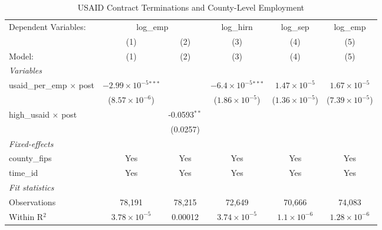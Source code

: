 
\begin{table}[htbp]
   \caption{\label{tab:main} USAID Contract Terminations and County-Level Employment}
   \centering
   \begin{adjustbox}{max width=\textwidth}
   \begin{tabular}{lccccc}
      \tabularnewline \midrule \midrule
      Dependent Variables: & \multicolumn{2}{c}{log\_emp} & log\_hirn & log\_sep & log\_emp\\
                                       & (1)                            & (2)            & (3)                           & (4)                     & (5) \\   
      Model:                           & (1)                            & (2)            & (3)                           & (4)                     & (5)\\  
      \midrule
      \emph{Variables}\\
      usaid\_per\_emp $\times$ post    & $-2.99\times 10^{-5}$$^{***}$  &                & $-6.4\times 10^{-5}$$^{***}$  & $1.47\times 10^{-5}$    & $1.67\times 10^{-5}$\\    
                                       & ($8.57\times 10^{-6}$)         &                & ($1.86\times 10^{-5}$)        & ($1.36\times 10^{-5}$)  & ($7.39\times 10^{-5}$)\\    
      high\_usaid $\times$ post        &                                & -0.0593$^{**}$ &                               &                         &   \\   
                                       &                                & (0.0257)       &                               &                         &   \\   
      \midrule
      \emph{Fixed-effects}\\
      county\_fips                     & Yes                            & Yes            & Yes                           & Yes                     & Yes\\  
      time\_id                         & Yes                            & Yes            & Yes                           & Yes                     & Yes\\  
      \midrule
      \emph{Fit statistics}\\
      Observations                     & 78,191                         & 78,215         & 72,649                        & 70,666                  & 74,083\\  
      Within R$^2$                     & $3.78\times 10^{-5}$           & 0.00012        & $3.74\times 10^{-5}$          & $1.1\times 10^{-6}$     & $1.28\times 10^{-6}$\\   

\end{tabular}
\end{adjustbox}
\end{table}
